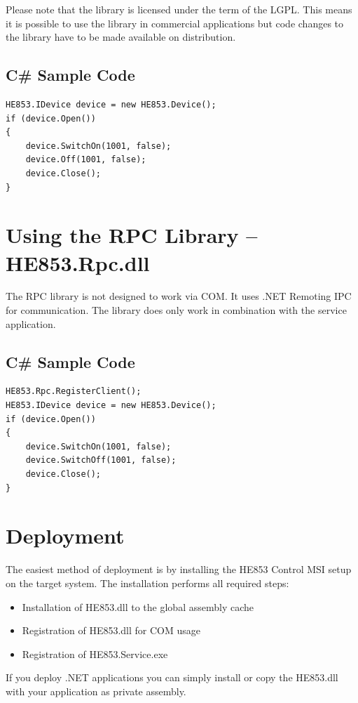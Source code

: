 \documentclass[
a4paper,
oneside,
halfparskip*,
normalheadings,
]
{scrbook}
\begin{document}
Please note that the library is licensed under the term of the LGPL. This means it is
possible to use the library in commercial applications but code changes to the library
have to be made available on distribution.

\subsection{C\# Sample Code}

\begin{verbatim}
HE853.IDevice device = new HE853.Device();
if (device.Open())
{
    device.SwitchOn(1001, false);
    device.Off(1001, false);
    device.Close();
}
\end{verbatim}

\section{Using the RPC Library -- HE853.Rpc.dll}

The RPC library is not designed to work via COM. It uses .NET Remoting IPC for
communication. The library does only work in combination with the service
application.

\subsection{C\# Sample Code}

\begin{verbatim}
HE853.Rpc.RegisterClient();
HE853.IDevice device = new HE853.Device();
if (device.Open())
{
    device.SwitchOn(1001, false);
    device.SwitchOff(1001, false);
    device.Close();
}
\end{verbatim}

\section{Deployment}
The easiest method of deployment is by installing the HE853 Control MSI setup on the target
system. The installation performs all required steps:

\begin{itemize}
  \item Installation of HE853.dll to the global assembly cache
	\item Registration of HE853.dll for COM usage
	\item Registration of HE853.Service.exe
\end{itemize}

If you deploy .NET applications you can simply install or copy the HE853.dll with your application
as private assembly.
\end{document}
